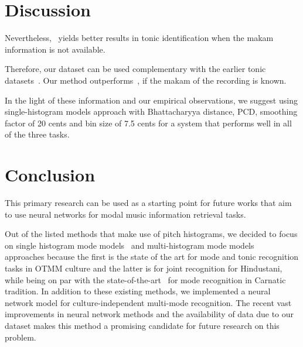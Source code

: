 \documentclass{sig-alternate}
\begin{document}
\section{Discussion}\label{sec:discussion}

Nevertheless,~\cite{sercan_tonic} yields better results in tonic identification when the makam information is not available.

Therefore, our dataset can be used complementary with the earlier tonic datasets~\cite{senturk2013karar_ismir, atli2014makamFeature_atmm}. Our method outperforms~\cite{sercan_tonic}, if the makam of the recording is known. 

In the light of these information and our empirical observations, we suggest using single-histogram models approach with Bhattacharyya distance, PCD, smoothing factor of 20 cents and bin size of 7.5 cents for a system that performs well in all of the three tasks. 


\section{Conclusion}\label{sec:conclusion}

This primary research can be used as a starting point for future works that aim to use neural networks for modal music information retrieval tasks. 

Out of the listed methods that make use of pitch histograms, we decided to focus on single histogram mode models~\cite{bozkurt_makam,bozkurt_tonic} and multi-histogram mode models~\cite{chordia} approaches because the first is the state of the art for mode and tonic recognition tasks in OTMM culture and the latter is for joint recognition for Hindustani, while being on par with the state-of-the-art~\cite{gulati_network} for mode recognition in Carnatic tradition. In addition to these existing methods, we implemented a neural network model for culture-independent multi-mode recognition. The recent vast improvements in neural network methods and the availability of data due to our dataset makes this method a promising candidate for future research on this problem. 




\end{document}
